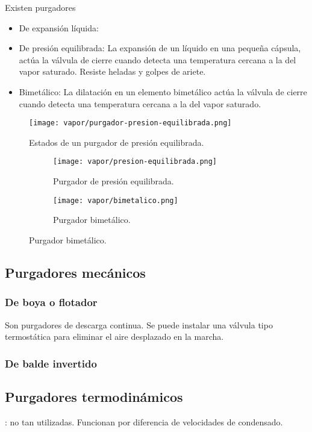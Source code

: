 Existen purgadores\begin{itemize}
    \item De expansión líquida:
    \item De presión equilibrada: La expansión de un líquido en una pequeña cápsula, actúa la válvula de cierre cuando detecta una temperatura cercana a la del vapor saturado. Resiste heladas y golpes de ariete.
    \item Bimetálico: La dilatación en un elemento bimetálico actúa la válvula de cierre cuando detecta una temperatura cercana a la del vapor saturado.
\end{itemize}

\begin{figure}[h]
    \centering
    \caption{Estados de un purgador de presión equilibrada.}
    \texttt{[image: vapor/purgador-presion-equilibrada.png]}
\end{figure}

\begin{figure}[h]
  \centering
  \caption{Purgadores termostáticos.}
  \begin{subfigure}{0.45\textwidth}
    \caption{Purgador de presión equilibrada.}
    \texttt{[image: vapor/presion-equilibrada.png]}
  \end{subfigure}
  \begin{subfigure}{0.45\textwidth}
    \caption{Purgador bimetálico.}
    \texttt{[image: vapor/bimetalico.png]}
  \end{subfigure}
\end{figure}


\subsection{Purgadores mecánicos}

\subsubsection{De boya o flotador}
Son purgadores de descarga continua. Se puede instalar una válvula tipo termostática para eliminar el aire desplazado en la marcha.

\subsubsection{De balde invertido}

\subsection{Purgadores termodinámicos}
: no tan utilizadas. Funcionan por diferencia de velocidades de condensado.

